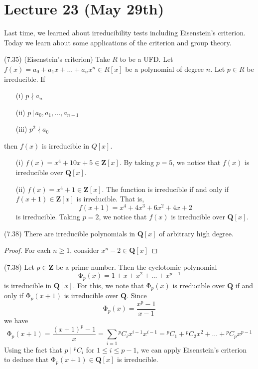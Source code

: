 \section{Lecture 23 (May 29th)}
Last time, we learned about irreducibility tests including Eisenstein's criterion. Today we learn about some applications of the criterion and group theory.
\newline
\begin{thm}
(7.35) (Eisenstein's criterion) Take $R$ to be a UFD. Let $f(x)=a_0+a_1x+\ldots +a_{n}x^{n}\in R[x]$ be a polynomial of degree $n$. Let $p\in R$ be irreducible. If
\begin{itemize}
\item[(i)] $p\nmid a_{n}$
\item[(ii)] $p\,|\,a_0,a_1,\ldots ,a_{n-1}$
\item[(iii)] $p^2\nmid a_0$ 
\end{itemize}
then $f(x)$ is irreducible in $Q[x]$. 
\end{thm}
\vspace{2ex}
\begin{ex}
\begin{itemize}
\item[(i)] $f(x)=x^{4}+10x+5\in {\bm Z}[x]$. By taking $p=5$, we notice that $f(x)$ is irreducible over ${\bm Q}[x]$. 
\item[(ii)] $f(x)=x^{4}+1\in {\bm Z}[x]$. The function is irreducible if and only if $f(x+1)\in {\bm Z}[x]$ is irreducible. That is,
\[f(x+1)=x^{4}+4x^{3}+6x^{2}+4x+2\]
is irreducible. Taking $p=2$, we notice that $f(x)$ is irreducible over ${\bm Q}[x]$.
\end{itemize}
\end{ex}
\vspace{2ex}
\begin{cor}
(7.38) There are irreducible polynomials in ${\bm Q}[x]$ of arbitrary high degree.
\end{cor}
\vspace{2ex}
\begin{proof}
For each $n\geq 1$, consider $x^{n}-2\in {\bm Q}[x]$ 
\end{proof}
\vspace{2ex}
\begin{ex}
(7.38) Let $p\in {\bm Z}$ be a prime number. Then the cyclotomic polynomial
\[\mathrm{\Phi} _{p}(x)=1+x+x^2+\ldots +x^{p-1}\]
is irreducible in ${\bm Q}[x]$. For this, we note that $\mathrm{\Phi} _{p}(x)$ is rreducible over ${\bm Q}$ if and only if $\mathrm{\Phi} _{p}(x+1)$ is irreducible over ${\bm Q}$. Since 
\[\mathrm{\Phi} _{p}(x)=\dfrac{x^{p}-1}{x-1}\]
we have
\[\mathrm{\Phi} _{p}(x+1)=\dfrac{(x+1)^{p}-1}{x}=\sum _{i=1}{}^{p}C_{i}x^{i-1}x^{i-1}={}^{p}C_{1}+{}^{p}C_{2}x^2+\ldots +{}^{p}C_{p}x^{p-1}\]
Using the fact that $p\;|\;{}^{p}C_{i}$ for $1\leq i\leq p-1$, we can apply Eisenstein's criterion to deduce that $\mathrm{\Phi} _{p}(x+1)\in {\bm Q}[x]$ is irreducible.
\end{ex}
